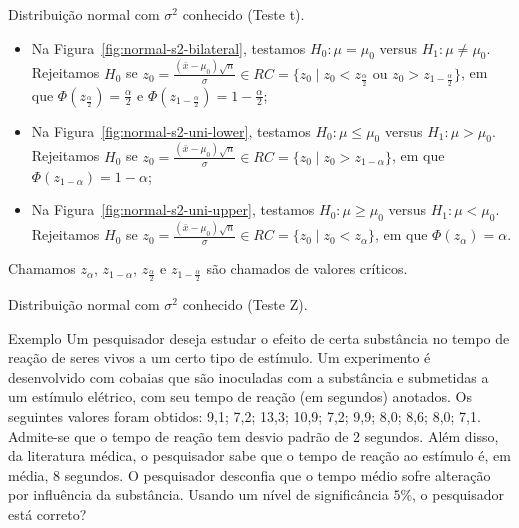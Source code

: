\documentclass[8pt]{beamer}
\begin{document}
\begin{frame}{Distribuição normal com $\sigma^2$ conhecido (Teste t).}

\large

\begin{itemize}
	\item Na Figura~\ref{fig:normal-s2-bilateral}, testamos $H_0: \mu = \mu_0$ versus $H_1: \mu \neq \mu_0$. Rejeitamos $H_0$ se $z_0 = \frac{(\bar{x} - \mu_0)\sqrt{n}}{\sigma} \in \allowbreak RC=\{z_0 \mid z_0 < z_\frac{\alpha}{2} \mbox{ ou } z_0 > z_{1-\frac{\alpha}{2}} \}$, em que $\Phi\left( z_\frac{\alpha}{2} \right) = \frac{\alpha}{2}$ e $\Phi\left( z_{1-\frac{\alpha}{2}} \right) = 1- \frac{\alpha}{2}$;
	\vfill
	
	\item Na Figura~\ref{fig:normal-s2-uni-lower}, testamos $H_0: \mu \leq \mu_0$ versus $H_1: \mu > \mu_0$. Rejeitamos $H_0$ se $z_0 = \frac{(\bar{x} - \mu_0)\sqrt{n}}{\sigma} \in \allowbreak RC=\{z_0 \mid z_0 > z_{1-\alpha}  \}$, em que $\Phi\left( z_{1-\alpha} \right) =1- \alpha$;
	\vfill
	
	\item Na Figura~\ref{fig:normal-s2-uni-upper}, testamos $H_0: \mu \geq \mu_0$ versus $H_1: \mu < \mu_0$. Rejeitamos $H_0$ se $z_0 = \frac{(\bar{x} - \mu_0)\sqrt{n}}{\sigma} \in \allowbreak RC=\{z_0 \mid z_0 < z_{\alpha}  \}$, em que $\Phi\left( z_{\alpha} \right) = \alpha$.
\end{itemize}
Chamamos $z_\alpha$, $z_{1-\alpha}$, $z_\frac{\alpha}{2}$ e $z_{1-\frac{\alpha}{2}}$ são chamados de valores críticos.
\normalsize

\end{frame}


\begin{frame}{Distribuição normal com $\sigma^2$ conhecido (Teste Z).}

\large

\begin{block}{Exemplo}
Um pesquisador deseja estudar o efeito de certa substância no tempo de reação de seres vivos a um certo tipo de estímulo. 
Um experimento é desenvolvido com cobaias que são inoculadas com a substância e submetidas a um estímulo elétrico, com seu tempo de reação (em segundos) anotados. 
Os seguintes valores foram obtidos: 9,1; 7,2; 13,3; 10,9; 7,2; 9,9; 8,0; 8,6; 8,0; 7,1. Admite-se que o tempo de reação tem desvio padrão de 2 segundos. Além disso, da literatura médica, o pesquisador sabe que o tempo de reação ao estímulo é, em média, 8 segundos.
O pesquisador desconfia que o tempo médio sofre alteração por influência da substância. Usando um nível de significância $5\%$, o pesquisador está correto? 
\end{block}

\normalsize

\end{frame}
\end{document}
